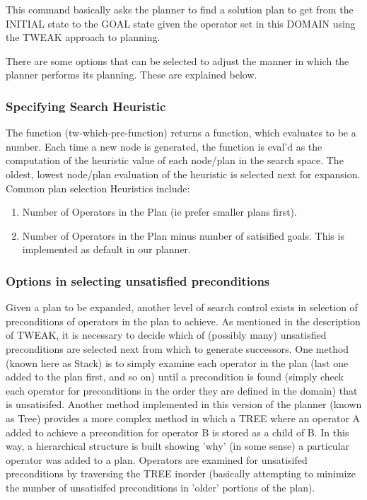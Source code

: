 This command basically asks the planner to find a solution plan to get from the INITIAL state to the GOAL state given the operator set in this DOMAIN using the TWEAK approach to planning.

There are some options that can be selected to adjust the manner in which the planner performs its planning.  These are explained below.

\subsubsection{Specifying Search Heuristic}

The function (tw-which-pre-function) returns a function, which evaluates to be a number.  Each time a new node is generated, the function is eval'd as the computation of the 
heuristic value of each node/plan in the search space.  
The oldest, lowest node/plan evaluation of the heuristic is selected next for
expansion.  Common plan selection Heuristics include:
\begin{enumerate}
\item Number of Operators in the Plan (ie prefer smaller plans first).  

\item Number of Operators in the Plan minus number of satisified
   goals. This is implemented as default in our planner.
\end{enumerate}


\subsubsection{Options in selecting unsatisfied preconditions}
Given a plan to be expanded, another level of search control exists in selection of preconditions of operators in the plan to achieve.
As mentioned in the description of TWEAK, it is necessary to decide which of
(possibly many) unsatisfied preconditions are selected next from which to
generate successors.  One method (known here as Stack) is to simply examine
each operator in the plan (last one added to the plan first, and so on) until a
precondition is found (simply check each operator for preconditions in the
order they are defined in the domain) that is unsatisifed.  Another method
implemented in this version of the planner (known as Tree) provides a more
complex method in which a TREE where an operator A added  to achieve a
precondition for operator B is stored as a child of B.  In this way, a
hierarchical structure is built showing 'why' (in some sense) a particular
operator was added to a plan.  Operators are examined for unsatisifed
preconditions by traversing the TREE inorder (basically attempting to minimize
the number of unsatisifed preconditions in 'older' portions of the plan).

